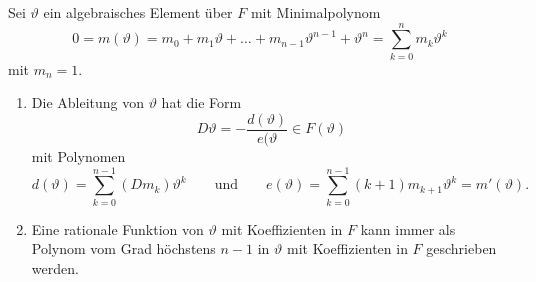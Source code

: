 \begin{satz}
\label{buch:intalg:liouville:polynome:satz:algebraisch}
Sei $\vartheta$ ein algebraisches Element über $F$ mit Minimalpolynom
\begin{equation}
0
=
m(\vartheta)
=
m_0 + m_1\vartheta + \ldots + m_{n-1}\vartheta^{n-1} + \vartheta^n
=
\sum_{k=0}^n m_k\vartheta^k
\label{buch:intalg:liouville:polynome:eqn:minimal}
\end{equation}
mit $m_n=1$.
\begin{enumerate}
\item
Die Ableitung von $\vartheta$ hat die Form
\[
D\vartheta
=
-
\frac{d(\vartheta)}{e(\vartheta}
\in
F(\vartheta)
\]
mit Polynomen 
\begin{equation}
d(\vartheta)
=
\sum_{k=0}^{n-1} (Dm_k) \vartheta^k
\qquad\text{und}\qquad
e(\vartheta)
=
\sum_{k=0}^{n-1} (k+1)m_{k+1} \vartheta^k
=
m'(\vartheta).
\label{buch:intalg:liouville:polynome:eqn:zaehlernenner}
\end{equation}
\item
Eine rationale Funktion von $\vartheta$ mit Koeffizienten in $F$
kann immer als Polynom vom Grad höchstens $n-1$ in $\vartheta$
mit Koeffizienten in $F$ geschrieben werden.
\end{enumerate}
\end{satz}

